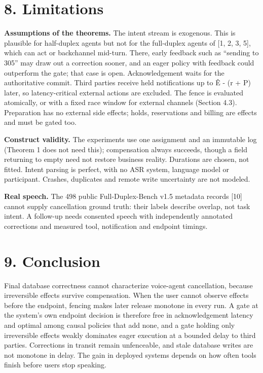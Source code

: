 \documentclass[11pt]{article}
\begin{document}
\section*{8. Limitations}

\textbf{Assumptions of the theorems.} The intent stream is exogenous. This is plausible for half-duplex agents but not for the full-duplex agents of [1, 2, 3, 5], which can act or backchannel mid-turn. There, early feedback such as ``sending to 305'' may draw out a correction sooner, and an eager policy with feedback could outperform the gate; that case is open. Acknowledgement waits for the authoritative commit. Third parties receive held notifications up to Ê - (r + P) later, so latency-critical external actions are excluded. The fence is evaluated atomically, or with a fixed race window for external channels (Section 4.3). Preparation has no external side effects; holds, reservations and billing are effects and must be gated too.


\textbf{Construct validity.} The experiments use one assignment and an immutable log (Theorem 1 does not need this); compensation always succeeds, though a field returning to empty need not restore business reality. Durations are chosen, not fitted. Intent parsing is perfect, with no ASR system, language model or participant. Crashes, duplicates and remote write uncertainty are not modeled.


\textbf{Real speech.} The 498 public Full-Duplex-Bench v1.5 metadata records [10] cannot supply cancellation ground truth: their labels describe overlap, not task intent. A follow-up needs consented speech with independently annotated corrections and measured tool, notification and endpoint timings.


\section*{9. Conclusion}

Final database correctness cannot characterize voice-agent cancellation, because irreversible effects survive compensation. When the user cannot observe effects before the endpoint, fencing makes later release monotone in every run. A gate at the system's own endpoint decision is therefore free in acknowledgement latency and optimal among causal policies that add none, and a gate holding only irreversible effects weakly dominates eager execution at a bounded delay to third parties. Corrections in transit remain unfenceable, and stale database writes are not monotone in delay. The gain in deployed systems depends on how often tools finish before users stop speaking.
\end{document}
